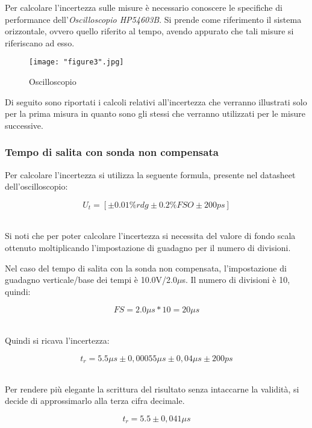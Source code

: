 \documentclass[a4paper]{article}
\begin{document}
Per calcolare l'incertezza sulle misure è necessario conoscere le specifiche di performance dell'\emph{Oscilloscopio HP54603B}. Si prende come riferimento il sistema orizzontale, ovvero quello riferito al tempo, avendo appurato che tali misure si riferiscano ad esso.

\begin{figure}[htp]
	\centering
	\texttt{[image: "figure3".jpg]}
	\caption{Oscilloscopio}
	\label{}
\end{figure}

Di seguito sono riportati i calcoli relativi all'incertezza che verranno illustrati solo per la prima misura in quanto sono gli stessi che verranno utilizzati per le misure successive.

\subsubsection{Tempo di salita con sonda non compensata}

Per calcolare l'incertezza si utilizza la seguente formula, presente nel datasheet dell'oscilloscopio:

\begin{Large}
	\begin{equation}
  		U_{t}=[\pm 0.01\%rdg\pm 0.2\%FSO \pm 200ps]
	\end{equation}
\end{Large}\\

Si noti che per poter calcolare l'incertezza si necessita del valore di fondo scala ottenuto moltiplicando l'impostazione di guadagno per il numero di divisioni.

Nel caso del tempo di salita con la sonda non compensata, l'impostazione di guadagno verticale/base dei tempi è 10.0V/2.0$\mu$s.
Il numero di divisioni è 10, quindi:
\begin{Large}
	\begin{equation}
  		FS=2.0\mu s * 10= 20\mu s
	\end{equation}
\end{Large}\\

Quindi si ricava l'incertezza:
\begin{Large}
	\begin{equation}
  		{t_r}= 5.5\mu s \pm 0,00055\mu s \pm0,04\mu s \pm200ps %
	\end{equation}
\end{Large}\\
Per rendere più elegante la scrittura del risultato senza intaccarne la validità, si decide di approssimarlo alla terza cifra decimale.
\begin{Large}
	\begin{equation}
  		{t_r}= 5.5\pm 0,041 \mu s
	\end{equation}
\end{Large}\\
\end{document}

